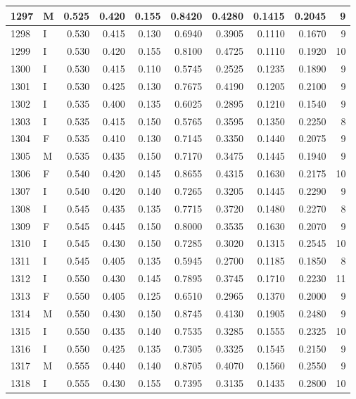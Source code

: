 \documentclass[9pt,twocolumn,twoside,]{pnas-new}
\begin{document}
\begin{tabular}{l|l|r|r|r|r|r|r|r|r}
\hline
1297 & M & 0.525 & 0.420 & 0.155 & 0.8420 & 0.4280 & 0.1415 & 0.2045 & 9\\
\hline
1298 & I & 0.530 & 0.415 & 0.130 & 0.6940 & 0.3905 & 0.1110 & 0.1670 & 9\\
\hline
1299 & I & 0.530 & 0.420 & 0.155 & 0.8100 & 0.4725 & 0.1110 & 0.1920 & 10\\
\hline
1300 & I & 0.530 & 0.415 & 0.110 & 0.5745 & 0.2525 & 0.1235 & 0.1890 & 9\\
\hline
1301 & I & 0.530 & 0.425 & 0.130 & 0.7675 & 0.4190 & 0.1205 & 0.2100 & 9\\
\hline
1302 & I & 0.535 & 0.400 & 0.135 & 0.6025 & 0.2895 & 0.1210 & 0.1540 & 9\\
\hline
1303 & I & 0.535 & 0.415 & 0.150 & 0.5765 & 0.3595 & 0.1350 & 0.2250 & 8\\
\hline
1304 & F & 0.535 & 0.410 & 0.130 & 0.7145 & 0.3350 & 0.1440 & 0.2075 & 9\\
\hline
1305 & M & 0.535 & 0.435 & 0.150 & 0.7170 & 0.3475 & 0.1445 & 0.1940 & 9\\
\hline
1306 & F & 0.540 & 0.420 & 0.145 & 0.8655 & 0.4315 & 0.1630 & 0.2175 & 10\\
\hline
1307 & I & 0.540 & 0.420 & 0.140 & 0.7265 & 0.3205 & 0.1445 & 0.2290 & 9\\
\hline
1308 & I & 0.545 & 0.435 & 0.135 & 0.7715 & 0.3720 & 0.1480 & 0.2270 & 8\\
\hline
1309 & F & 0.545 & 0.445 & 0.150 & 0.8000 & 0.3535 & 0.1630 & 0.2070 & 9\\
\hline
1310 & I & 0.545 & 0.430 & 0.150 & 0.7285 & 0.3020 & 0.1315 & 0.2545 & 10\\
\hline
1311 & I & 0.545 & 0.405 & 0.135 & 0.5945 & 0.2700 & 0.1185 & 0.1850 & 8\\
\hline
1312 & I & 0.550 & 0.430 & 0.145 & 0.7895 & 0.3745 & 0.1710 & 0.2230 & 11\\
\hline
1313 & F & 0.550 & 0.405 & 0.125 & 0.6510 & 0.2965 & 0.1370 & 0.2000 & 9\\
\hline
1314 & M & 0.550 & 0.430 & 0.150 & 0.8745 & 0.4130 & 0.1905 & 0.2480 & 9\\
\hline
1315 & I & 0.550 & 0.435 & 0.140 & 0.7535 & 0.3285 & 0.1555 & 0.2325 & 10\\
\hline
1316 & I & 0.550 & 0.425 & 0.135 & 0.7305 & 0.3325 & 0.1545 & 0.2150 & 9\\
\hline
1317 & M & 0.555 & 0.440 & 0.140 & 0.8705 & 0.4070 & 0.1560 & 0.2550 & 9\\
\hline
1318 & I & 0.555 & 0.430 & 0.155 & 0.7395 & 0.3135 & 0.1435 & 0.2800 & 10\\

\end{tabular}
\end{document}
